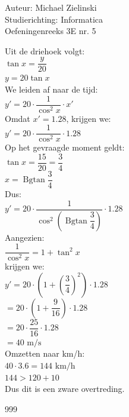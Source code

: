 \documentclass[a4paper]{article}
\newcommand{\Bgtan}{\operatorname{Bgtan}}
\begin{document}
  
\noindent \large Auteur: Michael Zielinski \\
\noindent \large Studierichting: Informatica\\
\noindent \large Oefeningenreeks 3E nr. 5\\

\medskip

\normalsize

Uit de driehoek volgt: \\

$ \tan x = \dfrac{y}{20} $ \\

$ y = 20\tan x $ \\

We leiden af naar de tijd: \\

$ y' = 20 \cdot \dfrac{1}{\cos^2 x} \cdot x' $ \\

Omdat $x' = 1.28$, krijgen we: \\

$ y' = 20 \cdot \dfrac{1}{\cos^2 x} \cdot 1.28 $ \\

Op het gevraagde moment geldt: \\

$ \tan x = \dfrac{15}{20} = \dfrac{3}{4} $ \\

$ x = \Bgtan\dfrac{3}{4} $ \\

Dus: \\

$ y' = 20 \cdot \dfrac{1}{\cos^2\left(\Bgtan\dfrac{3}{4}\right)} \cdot 1.28 $ \\

Aangezien: \\

$ \dfrac{1}{\cos^2 x} = 1+\tan^2 x $ \\

krijgen we: \\

$ y' = 20 \cdot \left(1+\left(\dfrac{3}{4}\right)^2\right) \cdot 1.28 $ \\

$ = 20 \cdot \left(1+\dfrac{9}{16}\right) \cdot 1.28 $ \\

$ = 20 \cdot \dfrac{25}{16} \cdot 1.28 $ \\

$ = 40 \text{ m/s} $ \\

Omzetten naar km/h: \\

$ 40 \cdot 3.6 = 144 \text{ km/h} $ \\

$ 144 > 120+10 $ \\

Dus dit is een zware overtreding. \\

\begin{thebibliography}{999}
\end{thebibliography}
\end{document}
